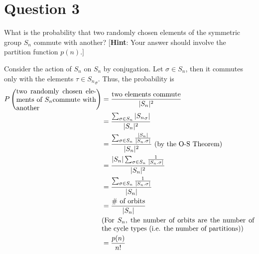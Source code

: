 \section{Question 3}

\begin{question}
    What is the probability that two randomly chosen elements of the symmetric group $S_n$ commute with another? [\textbf{Hint}: Your answer should involve the partition function $p(n) .]$
\end{question}

\begin{answer}
    Consider the action of $S_n$ on $S_n$ by conjugation. Let $\sigma \in S_n$, then it commutes only with the elements $\tau \in {S_n}_{\sigma}$. Thus, the probability is
    \begin{equation}
        \begin{aligned}
            P\left(\parbox{11.5em}{two randomly chosen elements of $S_n$commute with another}\right) &= \dfrac{\text{two elements commute}}{\lvert S_n\rvert^2}\\
            &= \dfrac{\sum_{\sigma \in S_n}{\lvert {S_n}_\sigma \rvert}}{\lvert S_n\rvert^2}\\
            &= \dfrac{\sum_{\sigma \in S_n}{\frac{\lvert S_n \rvert}{\lvert S_n.\sigma\rvert}}}{\lvert S_n \rvert^2} \text{ (by the O-S Theorem)}\\
            &=  \dfrac{\lvert S_n \rvert\sum_{\sigma \in S_n}{\frac{1}{\lvert S_n.\sigma\rvert}}}{\lvert S_n \rvert^2}\\
            &=  \dfrac{\sum_{\sigma \in S_n}{\frac{1}{\lvert S_n.\sigma\rvert}}}{\lvert S_n \rvert}\\
            &= \dfrac{\text{\# of orbits}}{\lvert S_n \rvert}\\
            &\parbox{22em}{(For $S_n$, the number of orbits are the number of the cycle types (i.e. the number of partitions))}\\
            &= \dfrac{p(n)}{n!}
        \end{aligned}
    \end{equation}
\end{answer}